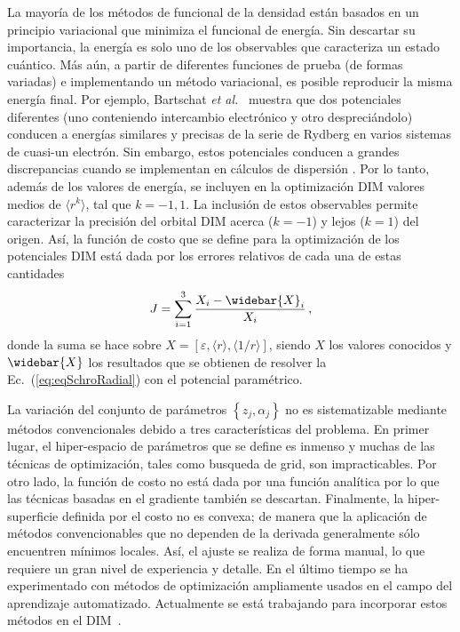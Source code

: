 La mayoría de los métodos de funcional de la densidad están basados en 
un principio variacional que minimiza el funcional de energía. Sin 
descartar su importancia, la energía es solo uno de los observables que 
caracteriza un estado cuántico. Más aún, a partir de diferentes 
funciones de prueba (de formas variadas) e implementando un método 
variacional, es posible reproducir la misma energía final. Por ejemplo, 
Bartschat \textit{et al.}~\cite{Albright:93,Bartschat:96} muestra que 
dos potenciales diferentes (uno conteniendo intercambio electrónico y 
otro despreciándolo) conducen a energías similares y precisas de la 
serie de Rydberg en varios sistemas de cuasi-un electrón. Sin embargo, 
estos potenciales conducen a grandes discrepancias cuando se implementan 
en cálculos de dispersión \cite{BartschatBray:96}. Por lo tanto, además 
de los valores de energía, se incluyen en la optimización DIM valores 
medios de $\langle r^k \rangle$, tal que $k=-1,1$. La inclusión de estos 
observables permite caracterizar la precisión del orbital DIM acerca 
($k=-1$) y lejos ($k=1$) del origen. Así, la función de costo que se 
define para la optimización de los potenciales DIM está dada por los 
errores relativos de cada una de estas cantidades
\begin{equation}
J=\sum_{i=1}^3 \frac{X_i-\widebar{X}_i}{X_i}\,,
\label{eq:fncosto-dim}
\end{equation}
donde la suma se hace sobre 
$X=\left[\varepsilon,\langle r \rangle,\langle 1/r \rangle\right]$, siendo 
$X$ los valores conocidos y $\widebar{X}$ los resultados que se obtienen
de resolver la Ec.~(\ref{eq:eqSchroRadial}) con el potencial paramétrico. 

La variación del conjunto de parámetros $\left\{z_j,\alpha_j\right\}$ no 
es sistematizable mediante métodos convencionales debido a tres 
características del problema. En primer lugar, el hiper-espacio de 
parámetros que se define es inmenso y muchas de las técnicas de 
optimización, tales como busqueda de grid, son impracticables. Por otro 
lado, la función de costo no está dada por una función analítica por lo 
que las técnicas basadas en el gradiente también se descartan. 
Finalmente, la hiper-superficie definida por el costo no es convexa; de 
manera que la aplicación de métodos convencionables que no dependen de 
la derivada generalmente sólo encuentren mínimos locales. Así, el ajuste 
se realiza de forma manual, lo que requiere un gran nivel de experiencia 
y detalle. En el último tiempo se ha experimentado con métodos de 
optimización ampliamente usados en el campo del aprendizaje 
automatizado. Actualmente se está trabajando para incorporar estos 
métodos en el DIM~\cite{DiFilippo:19}.

